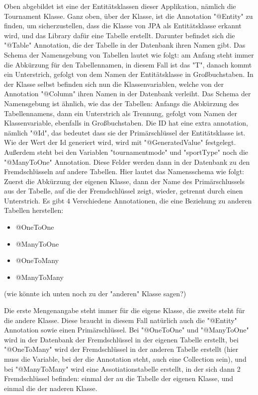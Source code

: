 Oben abgebildet ist eine der Entitätsklassen dieser Applikation, nämlich die Tournament Klasse. Ganz oben, über der Klasse, ist die Annotation "@Entity" zu finden, um sicherzustellen, dass die Klasse von JPA als Entitätsklasse erkannt wird, 
und das Library dafür eine Tabelle erstellt. Darunter befindet sich die "@Table" Annotation, die der Tabelle in der Datenbank ihren Namen gibt. Das Schema der Namensgebung von Tabellen lautet wie folgt: 
am Anfang steht immer die Abkürzung für den Tabellennamen, in diesem Fall ist das "T", danach kommt ein Unterstrich, gefolgt von dem Namen der Entitätsklasse in Großbuchstaben. 
In der Klasse selbst befinden sich nun die Klassenvariablen, welche von der Annotation "@Column" ihren Namen in der Datenbank verleiht. Das Schema der Namensgebung ist ähnlich, wie das der Tabellen: 
Anfangs die Abkürzung des Tabellennamens, dann ein Unterstrich als Trennung, gefolgt vom Namen der Klassenvariable, ebenfalls in Großbuchstaben. Die ID hat eine extra annotation, nämlich "@Id", 
das bedeutet dass sie der Primärschlüssel der Entitätsklasse ist. Wie der Wert der Id generiert wird, wird mit "@GeneratedValue" festgelegt. Außerdem steht bei den Variablen "tournamentmode" und "sportType" noch die "@ManyToOne" Annotation. 
Diese Felder werden dann in der Datenbank zu den Fremdschlüsseln auf andere Tabellen. Hier lautet das Namensschema wie folgt: Zuerst die Abkürzung der eigenen Klasse, 
dann der Name des Primärschlussels aus der Tabelle, auf die der Fremdschlüssel zeigt, wieder, getrennt durch einen Unterstrich.
Es gibt 4 Verschiedene Annotationen, die eine Beziehung zu anderen Tabellen herstellen:

\begin{itemize}
    \item @OneToOne
    \item @ManyToOne
    \item @OneToMany
    \item @ManyToMany
\end{itemize}

(wie könnte ich unten noch zu der "anderen" Klasse sagen?)

Die erste Mengenangabe steht immer für die eigene Klasse, die zweite steht für die andere Klasse. Diese braucht in diesem Fall natürlich auch die "@Entity" Annotation sowie einen Primärschlüssel. 
Bei "@OneToOne" und "@ManyToOne" wird in der Datenbank der Fremdschlüssel in der eigenen Tabelle erstellt, bei "@OneToMany" wird der Fremdschlüssel in der anderen Tabelle 
erstellt (hier muss die Variable, bei der die Annotation steht, auch eine Collection sein), und bei "@ManyToMany" wird eine Assotiationstabelle erstellt, in der sich dann 2 Fremdschlüssel befinden: 
einmal der au die Tabelle der eigenen Klasse, und einmal die der naderen Klasse.

